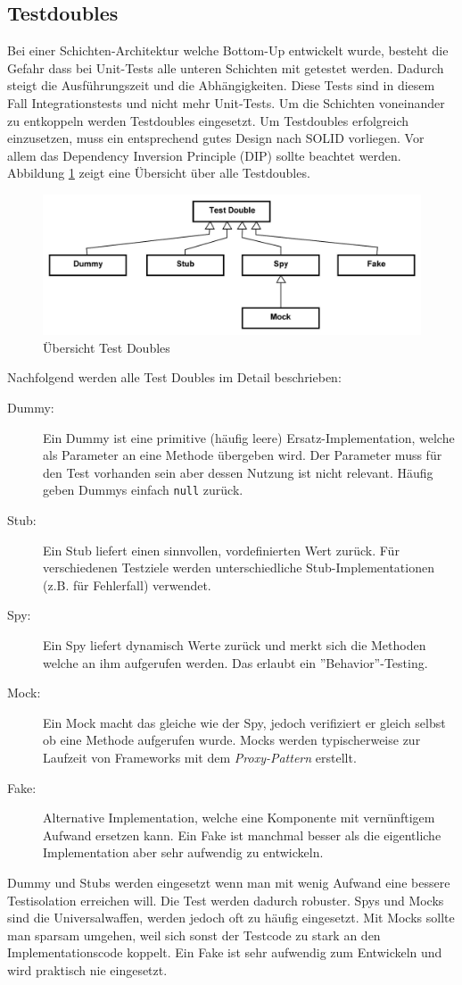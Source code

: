 \subsection{Testdoubles}

Bei einer Schichten-Architektur welche Bottom-Up entwickelt wurde, besteht die Gefahr dass bei Unit-Tests alle unteren Schichten mit getestet werden. Dadurch steigt die Ausführungszeit und die Abhängigkeiten. Diese Tests sind in diesem Fall Integrationstests und nicht mehr Unit-Tests.
Um die Schichten voneinander zu entkoppeln werden Testdoubles eingesetzt. Um Testdoubles erfolgreich einzusetzen, muss ein entsprechend gutes Design nach SOLID vorliegen. Vor allem das Dependency Inversion Principle (DIP) sollte beachtet werden. Abbildung \ref{fig:test-doubles} zeigt eine Übersicht über alle Testdoubles.
\begin{figure}
\centering
\includegraphics[width=0.7\linewidth]{fig/test-doubles}
\caption{Übersicht Test Doubles}
\label{fig:test-doubles}
\end{figure}
Nachfolgend werden alle Test Doubles im Detail beschrieben:
\begin{description}
	\item[Dummy:] Ein Dummy ist eine primitive (häufig leere) Ersatz-Implementation, welche als Parameter an eine Methode übergeben wird. Der Parameter muss für den Test vorhanden sein aber dessen Nutzung ist nicht relevant. Häufig geben Dummys einfach \texttt{null} zurück.
	\item[Stub:] Ein Stub liefert einen sinnvollen, vordefinierten Wert zurück. Für verschiedenen Testziele werden unterschiedliche Stub-Implementationen (z.B. für Fehlerfall) verwendet.
	\item[Spy:] Ein Spy liefert dynamisch Werte zurück und merkt sich die Methoden welche an ihm aufgerufen werden. Das erlaubt ein ''Behavior''-Testing.
	\item[Mock:] Ein Mock macht das gleiche wie der Spy, jedoch verifiziert er gleich selbst ob eine Methode aufgerufen wurde. Mocks werden typischerweise zur Laufzeit von Frameworks mit dem \emph{Proxy-Pattern} erstellt.
	\item[Fake:] Alternative Implementation, welche eine Komponente mit vernünftigem Aufwand ersetzen kann. Ein Fake ist manchmal besser als die eigentliche Implementation aber sehr aufwendig zu entwickeln.
\end{description}
Dummy und Stubs werden eingesetzt wenn man mit wenig Aufwand eine bessere Testisolation erreichen will. Die Test werden dadurch robuster. Spys und Mocks sind die Universalwaffen, werden jedoch oft zu häufig eingesetzt. Mit Mocks sollte man sparsam umgehen, weil sich sonst der Testcode zu stark an den Implementationscode koppelt. Ein Fake ist sehr aufwendig zum Entwickeln und wird praktisch nie eingesetzt.


